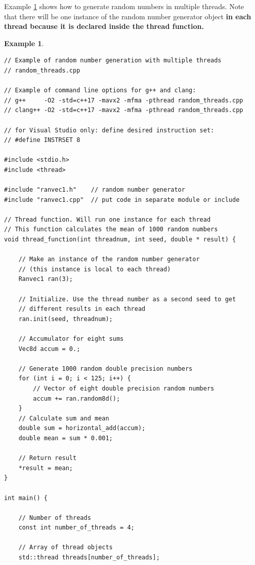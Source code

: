 \documentclass[11pt,a4paper,oneside,openright]{report}
\newtheorem{example}{Example}[chapter]  %
\newcommand{\vspacesmall}{\vspace{3mm}}
\newcommand{\codei}[1]{\bfseries \ttfamily{#1}\normalfont}
\begin{document}
Example \ref{exampleMultipleThreads} shows how to generate random numbers in multiple threads. Note that there will be one instance of the random number generator object \codei{Ranvec1} in each thread because it is declared inside the thread function.

\vspacesmall


\begin{example}
\label{exampleMultipleThreads}
\end{example} %
\begin{lstlisting}[frame=single]
// Example of random number generation with multiple threads
// random_threads.cpp

// Example of command line options for g++ and clang:
// g++     -O2 -std=c++17 -mavx2 -mfma -pthread random_threads.cpp
// clang++ -O2 -std=c++17 -mavx2 -mfma -pthread random_threads.cpp

// for Visual Studio only: define desired instruction set:
// #define INSTRSET 8

#include <stdio.h>
#include <thread>

#include "ranvec1.h"    // random number generator
#include "ranvec1.cpp"  // put code in separate module or include

// Thread function. Will run one instance for each thread
// This function calculates the mean of 1000 random numbers
void thread_function(int threadnum, int seed, double * result) {

    // Make an instance of the random number generator
    // (this instance is local to each thread)
    Ranvec1 ran(3);

    // Initialize. Use the thread number as a second seed to get
    // different results in each thread
    ran.init(seed, threadnum);

    // Accumulator for eight sums
    Vec8d accum = 0.;

    // Generate 1000 random double precision numbers
    for (int i = 0; i < 125; i++) {
        // Vector of eight double precision random numbers
        accum += ran.random8d();
    }
    // Calculate sum and mean
    double sum = horizontal_add(accum);
    double mean = sum * 0.001;

    // Return result
    *result = mean;    
}

int main() {

    // Number of threads
    const int number_of_threads = 4;

    // Array of thread objects
    std::thread threads[number_of_threads];


\end{lstlisting}
\end{document}
